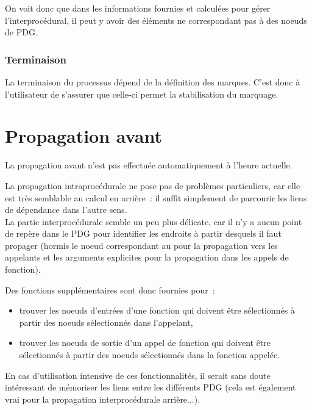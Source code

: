 On voit donc que dans les informations fournies et calculées
pour gérer l'interprocédural, il peut y avoir des éléments ne correspondant
pas à des noeuds de PDG.

\subsubsection{Terminaison}

La terminaison du processus dépend de la définition des marques.
C'est donc à l'utilisateur de s'assurer que celle-ci permet la stabilisation du
marquage.

\section{Propagation avant}

La propagation avant n'est pas effectuée automatiquement à l'heure actuelle.

La propagation intraprocédurale ne pose pas de problèmes particuliers,
car elle est très semblable au calcul en arrière~: il suffit simplement de
parcourir les liens de dépendance dans l'autre sens.\\

La partie interprocédurale semble un peu plus délicate,
car il n'y a aucun point de repère dans le PDG
pour identifier les endroits à partir desquels il faut propager
(hormis le noeud correspondant au 
pour la propagation vers les appelants et les arguments explicites pour
la propagation dans les appels de fonction).

Des fonctions supplémentaires sont donc fournies pour~:
\begin{itemize}
  \item trouver les noeuds d'entrées d'une fonction qui doivent être
    sélectionnés à partir des noeuds sélectionnés dans l'appelant,
  \item trouver les noeuds de sortie d'un appel de fonction
    qui doivent être
    sélectionnés à partir des noeuds sélectionnés dans la fonction appelée.
\end{itemize}

En cas d'utilisation intensive de ces fonctionnalités,
il serait sans doute intéressant de mémoriser les liens entre les
différents PDG (cela est également vrai pour la propagation interprocédurale
arrière...).\\
